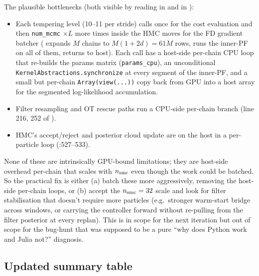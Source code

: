 \documentclass[11pt,a4paper]{article}
\begin{document}
The plausible bottlenecks (both visible by reading
 in 
and  in
):

\begin{itemize}[itemsep=2pt]
\item Each tempering level (10--11 per stride) calls
   once for the cost evaluation and
  then \texttt{num\_mcmc} $\times L$ more times inside the HMC moves
  for the FD gradient batcher (
  expands $M$ chains to $M(1+2d) = 61M$ rows, runs the inner-PF on
  all of them, returns to host). Each call has a host-side
  per-chain CPU loop that re-builds the params matrix
  (\texttt{params\_cpu}), an unconditional \texttt{KernelAbstractions.synchronize}
  at every segment of the inner-PF, and a small but per-chain
  \texttt{Array(view(...))} copy back from GPU into a host array
  for the segmented log-likelihood accumulation.
\item Filter resampling and OT rescue paths run a CPU-side per-chain
  branch (line 216, 252 of ).
\item HMC's accept/reject and posterior cloud update are on the host
  in a per-particle loop (:527--533).
\end{itemize}

None of these are intrinsically GPU-bound limitations; they are
host-side overhead per-chain that scales with $n_{\rm smc}$ even
though the work could be batched. So the practical fix is either
(a) batch these more aggressively, removing the host-side
per-chain loops, or (b) accept the $n_{\rm smc} = 32$ scale and
look for filter stabilisation that doesn't require more particles
(e.g.\ stronger warm-start bridge across windows, or carrying the
controller forward without re-pulling from the filter posterior at
every replan). This is in scope for the next iteration but out of
scope for the bug-hunt that was supposed to be a pure
``why does Python work and Julia not?'' diagnosis.

\subsection{Updated summary table}
\end{document}

